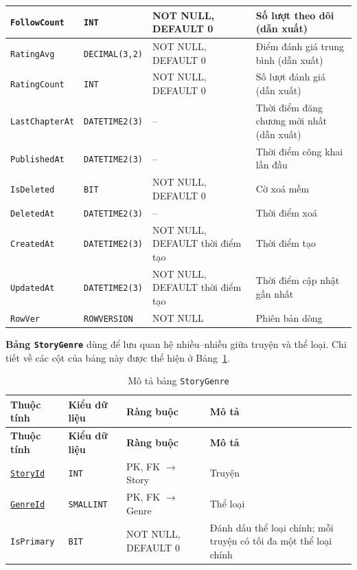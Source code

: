 {\begin{longtable}{|>{\raggedright\arraybackslash}p{3.1cm}|>{\raggedright\arraybackslash}p{2.7cm}|>{\raggedright\arraybackslash}p{4.0cm}|>{\raggedright\arraybackslash}p{5.4cm}|}
\texttt{FollowCount} & \texttt{INT} & NOT NULL, DEFAULT 0 & Số lượt theo dõi (dẫn xuất) \\ \hline
\texttt{RatingAvg} & \texttt{DECIMAL(3,2)} & NOT NULL, DEFAULT 0 & Điểm đánh giá trung bình (dẫn xuất) \\ \hline
\texttt{RatingCount} & \texttt{INT} & NOT NULL, DEFAULT 0 & Số lượt đánh giá (dẫn xuất) \\ \hline
\texttt{LastChapterAt} & \texttt{DATETIME2(3)} & -- & Thời điểm đăng chương mới nhất (dẫn xuất) \\ \hline
\texttt{PublishedAt} & \texttt{DATETIME2(3)} & -- & Thời điểm công khai lần đầu \\ \hline
\texttt{IsDeleted} & \texttt{BIT} & NOT NULL, DEFAULT 0 & Cờ xoá mềm \\ \hline
\texttt{DeletedAt} & \texttt{DATETIME2(3)} & -- & Thời điểm xoá \\ \hline
\texttt{CreatedAt} & \texttt{DATETIME2(3)} & NOT NULL, DEFAULT thời điểm tạo & Thời điểm tạo \\ \hline
\texttt{UpdatedAt} & \texttt{DATETIME2(3)} & NOT NULL, DEFAULT thời điểm tạo & Thời điểm cập nhật gần nhất \\ \hline
\texttt{RowVer} & \texttt{ROWVERSION} & NOT NULL & Phiên bản dòng \\ \hline
\end{longtable}
}

\textbf{Bảng \texttt{StoryGenre}} dùng để lưu quan hệ nhiều--nhiều giữa truyện và thể loại. Chi tiết về các cột của bảng này được thể hiện ở Bảng~\ref{tab:db-story-genre}.


{\small
\renewcommand{\arraystretch}{1.2}
\begin{longtable}{|>{\raggedright\arraybackslash}p{3.1cm}|>{\raggedright\arraybackslash}p{2.7cm}|>{\raggedright\arraybackslash}p{4.0cm}|>{\raggedright\arraybackslash}p{5.4cm}|}
\caption{Mô tả bảng \texttt{StoryGenre}}\label{tab:db-story-genre}\\
\hline
\textbf{Thuộc tính} & \textbf{Kiểu dữ liệu} & \textbf{Ràng buộc} & \textbf{Mô tả} \\ \hline
\endfirsthead
\hline
\textbf{Thuộc tính} & \textbf{Kiểu dữ liệu} & \textbf{Ràng buộc} & \textbf{Mô tả} \\ \hline
\endhead
\underline{\texttt{StoryId}} & \texttt{INT} & PK, FK $\rightarrow$ Story & Truyện \\ \hline
\underline{\texttt{GenreId}} & \texttt{SMALLINT} & PK, FK $\rightarrow$ Genre & Thể loại \\ \hline
\texttt{IsPrimary} & \texttt{BIT} & NOT NULL, DEFAULT 0 & Đánh dấu thể loại chính; mỗi truyện có tối đa một thể loại chính \\ \hline
\end{longtable}
}

